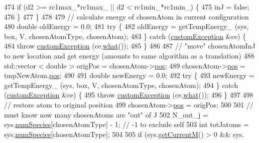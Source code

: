 \begin{DoxyCode}
474                 \textcolor{keywordflow}{if} (d2 >= rc1max\_*rc1max\_ || d2 < rc1min\_*rc1min\_) \{
475                                 inJ = \textcolor{keyword}{false};
476                         \}
477                     \}
478 
479             \textcolor{comment}{// calculate energy of chosenAtom in current configuration}
480             \textcolor{keywordtype}{double} oldEnergy = 0.0;
481                 \textcolor{keywordflow}{try} \{
482                         oldEnergy = getTempEnergy\_ (sys, box, V, chosenAtomType, chosenAtom);
483                 \} \textcolor{keywordflow}{catch} (\hyperlink{classcustom_exception}{customException} &ce) \{
484                         \textcolor{keywordflow}{throw} \hyperlink{classcustom_exception}{customException} (ce.\hyperlink{classcustom_exception_aeb6ab5848b038adfc68fde86a512f691}{what}());
485                     \}
486 
487                 \textcolor{comment}{// "move" chosenAtomInJ to new location and get energy (amounts to same algorithm as a
       translation)}
488                     std::vector < double > origPos = chosenAtom->\hyperlink{classatom_a3ae5f4880e7831d8b2c9fda72b4eb24a}{pos};
489                     chosenAtom->\hyperlink{classatom_a3ae5f4880e7831d8b2c9fda72b4eb24a}{pos} = tmpNewAtom.\hyperlink{classatom_a3ae5f4880e7831d8b2c9fda72b4eb24a}{pos};
490 
491                     \textcolor{keywordtype}{double} newEnergy = 0.0;
492                     \textcolor{keywordflow}{try} \{
493                         newEnergy = getTempEnergy\_ (sys, box, V, chosenAtomType, chosenAtom);
494                     \} \textcolor{keywordflow}{catch} (\hyperlink{classcustom_exception}{customException} &ce) \{
495                         \textcolor{keywordflow}{throw} \hyperlink{classcustom_exception}{customException} (ce.\hyperlink{classcustom_exception_aeb6ab5848b038adfc68fde86a512f691}{what}());
496                     \}
497 
498                \textcolor{comment}{// restore atom to original position}
499                     chosenAtom->\hyperlink{classatom_a3ae5f4880e7831d8b2c9fda72b4eb24a}{pos} = origPos;
500 
501             \textcolor{comment}{// must know now many chosenAtoms are "out" of J}
502                     N\_out\_j = sys.\hyperlink{classsim_system_a9eea865e6dc1cff377b1e79c4d9c23f0}{numSpecies}[chosenAtomType] - 1; \textcolor{comment}{// -1 to exclude self}
503             \textcolor{keywordtype}{int} totJatoms = sys.\hyperlink{classsim_system_a9eea865e6dc1cff377b1e79c4d9c23f0}{numSpecies}[chosenAtomType];
504 
505                     \textcolor{keywordflow}{if} (sys.\hyperlink{classsim_system_a299fe4372e610b554eaaf5f5957b2dbc}{getCurrentM}() > 0 && sys.

\end{DoxyCode}
